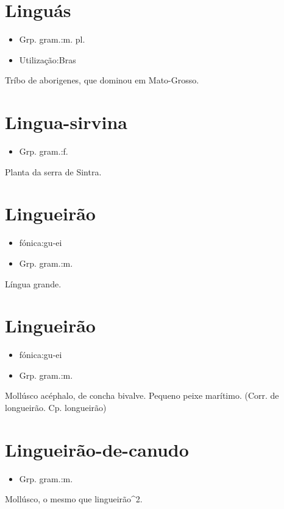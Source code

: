 \section{Linguás}
\begin{itemize}
\item {Grp. gram.:m. pl.}
\end{itemize}
\begin{itemize}
\item {Utilização:Bras}
\end{itemize}
Tríbo de aborigenes, que dominou em Mato-Grosso.
\section{Lingua-sirvina}
\begin{itemize}
\item {Grp. gram.:f.}
\end{itemize}
Planta da serra de Sintra.
\section{Lingueirão}
\begin{itemize}
\item {fónica:gu-ei}
\end{itemize}
\begin{itemize}
\item {Grp. gram.:m.}
\end{itemize}
Língua grande.
\section{Lingueirão}
\begin{itemize}
\item {fónica:gu-ei}
\end{itemize}
\begin{itemize}
\item {Grp. gram.:m.}
\end{itemize}
Mollúsco acéphalo, de concha bivalve.
Pequeno peixe marítimo.
(Corr. de \textunderscore longueirão\textunderscore . Cp. \textunderscore longueirão\textunderscore )
\section{Lingueirão-de-canudo}
\begin{itemize}
\item {Grp. gram.:m.}
\end{itemize}
Mollúsco, o mesmo que \textunderscore lingueirão\textunderscore ^2.
